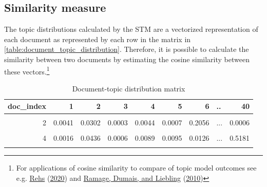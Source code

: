 \documentclass[
  12pt,
]{article}
\begin{document}
\hypertarget{similarity-measure}{%
\subsection{Similarity measure}\label{similarity-measure}}

The topic distributions calculated by the STM are a vectorized
representation of each document as represented by each row in the matrix
in \autoref{table:document_topic_distribution}. Therefore, it is
possible to calculate the similarity between two documents by estimating
the cosine similarity between these vectors.\footnote{For applications
  of cosine similarity to compare of topic model outcomes see e.g.
  \protect\hyperlink{ref-rehs_structural_2020}{Rehs}
  (\protect\hyperlink{ref-rehs_structural_2020}{2020}) and
  \protect\hyperlink{ref-ramage_characterizing_2010}{Ramage, Dumais, and
  Liebling} (\protect\hyperlink{ref-ramage_characterizing_2010}{2010})}

\begin{table}[H]

\caption{\label{tab:Document-topic distribution matrix - sample values}Document-topic distribution matrix \label{table:document_topic_distribution}}
\centering
\fontsize{7}{9}\selectfont
\begin{tabular}[t]{rrrrrrrlr}
\toprule
doc\_index & 1 & 2 & 3 & 4 & 5 & 6 & .. & 40\\
\midrule
\cellcolor{gray!6}{1} & \cellcolor{gray!6}{0.0016} & \cellcolor{gray!6}{0.0453} & \cellcolor{gray!6}{0.0005} & \cellcolor{gray!6}{0.0078} & \cellcolor{gray!6}{0.0151} & \cellcolor{gray!6}{0.0118} & \cellcolor{gray!6}{...} & \cellcolor{gray!6}{0.4376}\\
2 & 0.0041 & 0.0302 & 0.0003 & 0.0044 & 0.0007 & 0.2056 & ... & 0.0006\\
\cellcolor{gray!6}{3} & \cellcolor{gray!6}{0.0043} & \cellcolor{gray!6}{0.0039} & \cellcolor{gray!6}{0.0012} & \cellcolor{gray!6}{0.0003} & \cellcolor{gray!6}{0.0017} & \cellcolor{gray!6}{0.0266} & \cellcolor{gray!6}{...} & \cellcolor{gray!6}{0.0050}\\
4 & 0.0016 & 0.0436 & 0.0006 & 0.0089 & 0.0095 & 0.0126 & ... & 0.5181\\
\cellcolor{gray!6}{5} & \cellcolor{gray!6}{0.0016} & \cellcolor{gray!6}{0.0515} & \cellcolor{gray!6}{0.0002} & \cellcolor{gray!6}{0.0122} & \cellcolor{gray!6}{0.0050} & \cellcolor{gray!6}{0.0121} & \cellcolor{gray!6}{...} & \cellcolor{gray!6}{0.5750}\\
\bottomrule
\end{tabular}
\end{table}
\end{document}
